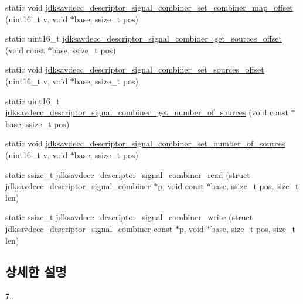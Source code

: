 \begin{DoxyCompactItemize}
\item 
static void \hyperlink{group__descriptor__signal__combiner_gae84470bf686a2904a0f7041112da98e0}{jdksavdecc\+\_\+descriptor\+\_\+signal\+\_\+combiner\+\_\+set\+\_\+combiner\+\_\+map\+\_\+offset} (uint16\+\_\+t v, void $\ast$base, ssize\+\_\+t pos)
\item 
static uint16\+\_\+t \hyperlink{group__descriptor__signal__combiner_ga5e4ca098c26ca924f806e96c4aa8b2d5}{jdksavdecc\+\_\+descriptor\+\_\+signal\+\_\+combiner\+\_\+get\+\_\+sources\+\_\+offset} (void const $\ast$base, ssize\+\_\+t pos)
\item 
static void \hyperlink{group__descriptor__signal__combiner_ga909896034ca5de747f1e657279e7ac43}{jdksavdecc\+\_\+descriptor\+\_\+signal\+\_\+combiner\+\_\+set\+\_\+sources\+\_\+offset} (uint16\+\_\+t v, void $\ast$base, ssize\+\_\+t pos)
\item 
static uint16\+\_\+t \hyperlink{group__descriptor__signal__combiner_ga00d18de5a7f4a9d44cb3948e12cc5f00}{jdksavdecc\+\_\+descriptor\+\_\+signal\+\_\+combiner\+\_\+get\+\_\+number\+\_\+of\+\_\+sources} (void const $\ast$base, ssize\+\_\+t pos)
\item 
static void \hyperlink{group__descriptor__signal__combiner_ga1b9d7d4c7b165190040636377fb70183}{jdksavdecc\+\_\+descriptor\+\_\+signal\+\_\+combiner\+\_\+set\+\_\+number\+\_\+of\+\_\+sources} (uint16\+\_\+t v, void $\ast$base, ssize\+\_\+t pos)
\item 
static ssize\+\_\+t \hyperlink{group__descriptor__signal__combiner_ga39bb0d8c35a6d16674b85d4e2701503c}{jdksavdecc\+\_\+descriptor\+\_\+signal\+\_\+combiner\+\_\+read} (struct \hyperlink{structjdksavdecc__descriptor__signal__combiner}{jdksavdecc\+\_\+descriptor\+\_\+signal\+\_\+combiner} $\ast$p, void const $\ast$base, ssize\+\_\+t pos, size\+\_\+t len)
\item 
static ssize\+\_\+t \hyperlink{group__descriptor__signal__combiner_gaad6b12ccd137674d9844f8718e8c7c7b}{jdksavdecc\+\_\+descriptor\+\_\+signal\+\_\+combiner\+\_\+write} (struct \hyperlink{structjdksavdecc__descriptor__signal__combiner}{jdksavdecc\+\_\+descriptor\+\_\+signal\+\_\+combiner} const $\ast$p, void $\ast$base, size\+\_\+t pos, size\+\_\+t len)
\end{DoxyCompactItemize}


\subsection{상세한 설명}
7.. 

